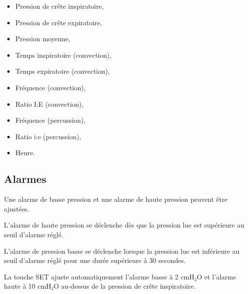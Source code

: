 \begin{itemize}
\item Pression de crête inspiratoire,
\item Pression de crête expiratoire,
\item Pression moyenne,
\item Temps inspiratoire (convection),
\item Temps expiratoire (convection),
\item Fréquence (convection),
\item Ratio I:E (convection),
\item Fréquence (percussion),
\item Ratio i:e (percussion),
\item Heure.
\end{itemize}

\subsection{Alarmes}

Une alarme de basse pression et une alarme de haute pression peuvent être ajustées.

L’alarme de haute pression se déclenche dès que la pression lue est supérieure
au seuil d’alarme réglé.

L’alarme de pression basse se déclenche lorsque la pression lue est inférieure
au seuil d’alarme réglé pour une durée supérieure à 30 secondes.

La touche SET ajuste automatiquement l’alarme basse à 2 cmH₂O et l’alarme haute
à 10 cmH₂O au-dessus de la pression de crête inspiratoire.
